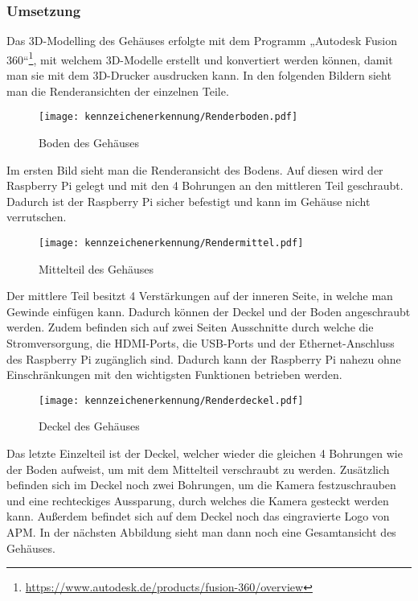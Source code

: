 \subsubsection{Umsetzung}
Das 3D-Modelling des Gehäuses erfolgte mit dem Programm „Autodesk Fusion 360“\footnote{\url{https://www.autodesk.de/products/fusion-360/overview}}, mit welchem 3D-Modelle erstellt und konvertiert werden können, 
damit man sie mit dem 3D-Drucker ausdrucken kann. In den folgenden Bildern sieht man die Renderansichten der einzelnen Teile.

\begin{figure}[H]
    \centering
    \texttt{[image: kennzeichenerkennung/Renderboden.pdf]}
    \caption{Boden des Gehäuses}
\end{figure}

Im ersten Bild sieht man die Renderansicht des Bodens. Auf diesen wird der Raspberry Pi gelegt und mit den 4 Bohrungen an den mittleren Teil geschraubt. 
Dadurch ist der Raspberry Pi sicher befestigt und kann im Gehäuse nicht verrutschen.

\begin{figure}[H]
    \centering
    \texttt{[image: kennzeichenerkennung/Rendermittel.pdf]}
    \caption{Mittelteil des Gehäuses}
\end{figure}

Der mittlere Teil besitzt 4 Verstärkungen auf der inneren Seite, in welche man Gewinde einfügen kann. Dadurch können der Deckel und der Boden angeschraubt werden. 
Zudem befinden sich auf zwei Seiten Ausschnitte durch welche die Stromversorgung, die HDMI-Ports, die USB-Ports und der Ethernet-Anschluss des Raspberry Pi 
zugänglich sind. Dadurch kann der Raspberry Pi nahezu ohne Einschränkungen mit den wichtigsten Funktionen betrieben werden.

\begin{figure}[H]
    \centering
    \texttt{[image: kennzeichenerkennung/Renderdeckel.pdf]}
    \caption{Deckel des Gehäuses}
\end{figure}

Das letzte Einzelteil ist der Deckel, welcher wieder die gleichen 4 Bohrungen wie der Boden aufweist, um mit dem Mittelteil verschraubt zu werden. 
Zusätzlich befinden sich im Deckel noch zwei Bohrungen, um die Kamera festzuschrauben und eine rechteckiges Aussparung, durch welches die Kamera gesteckt werden kann. 
Außerdem befindet sich auf dem Deckel noch das eingravierte Logo von APM. In der nächsten Abbildung sieht man dann noch eine Gesamtansicht des Gehäuses.

